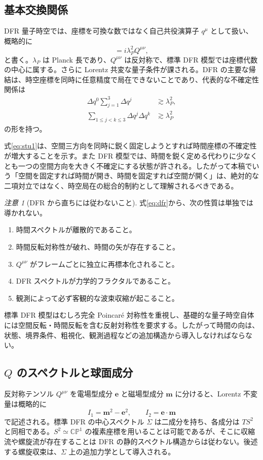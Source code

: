 \documentclass[a4paper,11pt]{ltjsarticle}
\theoremstyle{remark}
\newtheorem{remark}[definition]{注意}
\newcommand{\CP}{\mathbb{CP}}
\begin{document}
\subsection{基本交換関係}
DFR 量子時空では、座標を可換な数ではなく自己共役演算子 $q^\mu$ として扱い、概略的に
\begin{equation}
 [q^\mu,q^\nu]=i\lambda_P^2 Q^{\mu\nu},
 \label{eq:dfr}
\end{equation}
と書く。$\lambda_P$ は Planck 長であり、$Q^{\mu\nu}$ は反対称で、標準 DFR 模型では座標代数の中心に属する。さらに Lorentz 共変な量子条件が課される。DFR の主要な帰結は、時空座標を同時に任意精度で局在できないことであり、代表的な不確定性関係は
\begin{align}
 \Delta q^0\sum_{j=1}^3\Delta q^j &\gtrsim \lambda_P^2,
 \label{eq:stu1}\\
 \sum_{1\leq j<k\leq 3}\Delta q^j\Delta q^k &\gtrsim \lambda_P^2
 \label{eq:stu2}
\end{align}
の形を持つ\cite{DFR1995}。

式\eqref{eq:stu1}は、空間三方向を同時に鋭く固定しようとすれば時間座標の不確定性が増大することを示す。また DFR 模型では、時間を鋭く定める代わりに少なくとも一つの空間方向を大きく不確定にする状態が許される。したがって本稿でいう「空間を固定すれば時間が開き、時間を固定すれば空間が開く」は、絶対的な二項対立ではなく、時空局在の総合的制約として理解されるべきである。

\begin{remark}[DFR から直ちには従わないこと]
式\eqref{eq:dfr}から、次の性質は単独では導かれない。
\begin{enumerate}
  \item 時間スペクトルが離散的であること。
  \item 時間反転対称性が破れ、時間の矢が存在すること。
  \item $Q^{\mu\nu}$ がフレームごとに独立に再標本化されること。
  \item DFR スペクトルが力学的フラクタルであること。
  \item 観測によって必ず客観的な波束収縮が起こること。
\end{enumerate}
標準 DFR 模型はむしろ完全 Poincar\'e 対称性を重視し、基礎的な量子時空自体には空間反転・時間反転を含む反射対称性を要求する\cite{DFR1995}。したがって時間の向は、状態、境界条件、粗視化、観測過程などの追加構造から導入しなければならない。
\end{remark}

\subsection{$Q$ のスペクトルと球面成分}
反対称テンソル $Q^{\mu\nu}$ を電場型成分 $\bm e$ と磁場型成分 $\bm m$ に分けると、Lorentz 不変量は概略的に
\begin{equation}
 I_1=\bm m^2-\bm e^2,\qquad I_2=\bm e\cdot\bm m
\end{equation}
で記述される。標準 DFR の中心スペクトル $\Sigma$ は二成分を持ち、各成分は $TS^2$ と同相である\cite{DFR1995}。$S^2\simeq\CP^1$ の複素座標を用いることは可能であるが、そこに収縮流や螺旋流が存在することは DFR の静的スペクトル構造からは従わない。後述する螺旋収束は、$\Sigma$ 上の追加力学として導入される。
\end{document}

